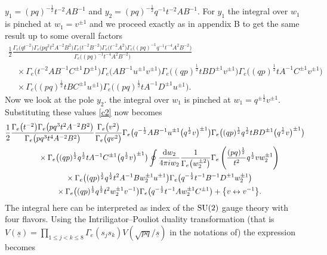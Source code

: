 \documentclass[a4paper,12pt]{article}
\begin{document}
 $y_1=(pq)^{-\frac12}t^{-2}AB^{-1}$ and $y_2=(pq)^{-\frac12}q^{-1}t^{-2}AB^{-1}$. For $y_1$ the integral over $w_1$ is pinched at $w_1=v^{\pm1}$ and we proceed exactly as in appendix B to get the same result up to some overall factors
\begin{gather}
\frac12 \frac{\Gamma_e\big(qt^{-2}\big)\Gamma_e\big(pq^2t^2A^{-2}B^2\big)\Gamma_e\big(t^{-2}B^{-2}\big)\Gamma_e\big(t^{-2}A^2\big) \Gamma_e\big((pq)^{-1}q^{-1}t^{-4}A^2 B^{-2}\big)} {\Gamma_e\big((pq)^{-1}t^{-4}A^2 B^{-2}\big)}\nonumber\\
\quad{}\times\Gamma_e\big(t^{-2}AB^{-1}C^{\pm1}D^{\pm1}\big)
\Gamma_e\big( AB^{-1} u^{\pm1} v^{\pm1}\big)\Gamma_e\big((qp)^{\frac12}t BD^{\pm1} v^{\pm1}\big)
\Gamma_e\big((q p)^{\frac12}t A^{-1} C^{\pm1} v^{\pm1}\big)\nonumber\\
\quad{}\times\Gamma_e\big((pq)^\frac12 t B C^{\pm1}u^{\pm1}\big)\Gamma_e\big((pq)^\frac12 t A^{-1}D^{\pm1}u^{\pm1}\big).
\end{gather}
Now we look at the pole $y_2$. the integral over $w_1$ is pinched at $w_1=q^{\pm\frac12}v^{\pm1}$. Substituting these values \eqref{c2} now becomes
\begin{gather*}
\frac12\frac{\Gamma_e\big(t^{-2}\big)\Gamma_e\big(pq^3t^2A^{-2}B^2\big)}
{\Gamma_e\big(pq^3 t^4 A^{-2}B^2\big)}\frac{\Gamma_e\big(v^2\big)}{\Gamma_e\big(qv^2\big)}
\Gamma_e\big( q^{-\frac12}AB^{-1}u^{\pm1}\big(q^\frac12 v\big)^{\pm1}\big)\Gamma_e\big((qp)^{\frac12}q^\frac12 t B D^{\pm1}\big(q^\frac12 v\big)^{\pm1}\big)\\
\quad{} \times\Gamma_e\big( ( q p)^{\frac12} q^\frac12 t A^{-1} C^{\pm1} \big(q^\frac12 v\big)^{\pm1}\big)
\oint \frac{{\rm d}w_2}{4\pi i w_2} \frac{1}{\Gamma_e\big(w_2^{\pm2}\big)} \Gamma_e\left(\frac{(p q)^{\frac12}}{t^2}q^\frac12 v w_2^{\pm1}\right)\\
\quad{}\times \Gamma_e\big((q p)^{\frac12}q^\frac12 t^2 A^{-1} B w_2^{\pm1} u^{\pm1}\big) \Gamma_e \big(q^{-\frac12} t^{-1} B^{-1} D^{\pm1}w_2^{\pm1}\big)\\
\quad{}\times \Gamma_e\big( ( q p )^{\frac12}q^\frac12 t^2 w_2^{\pm1} v^{-1}\big) \Gamma_e\big( q^{-\frac12}t^{-1} A w_2^{\pm1} C^{\pm1}\big)
+\big\{v \leftrightarrow v^{-1} \big\} .
\end{gather*}
The integral here can be interpreted as index of the ${\rm SU}(2)$ gauge theory with four flavors. Using the Intriligator--Pouliot duality transformation (that is $V(\underline{s})={\prod\limits_{1\leq j < k\leq 8} \Gamma_e(s_j s_k)V(\sqrt{pq}/\underline{s})}$ in the notations of) the expression becomes
\end{document}
